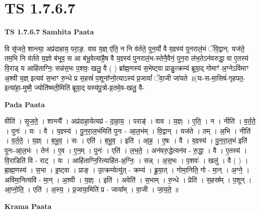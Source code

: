 \documentclass[17pt]{extarticle}
\begin{document}
\section*{ TS 1.7.6.7 }

\textbf{TS 1.7.6.7 } \newline
\textbf{Samhita Paata} \newline

वि सृ॑जते॒ शान्त्या॒ अप्र॑दाहाय॒ परा॒ङ॒. वाव य॒ज्ञ् ए॑ति॒ न नि व॑र्तते॒ पुन॒र्यो वै य॒ज्ञ्स्य॑ पुनरालं॒भं ॅवि॒द्वान्. यज॑ते॒ तम॒भि नि व॑र्तते य॒ज्ञो ब॑भूव॒ स आ ब॑भू॒वेत्या॑है॒ष वै य॒ज्ञ्स्य॑ पुनरालं॒भ-स्तेनै॒वैनं॒ पुन॒रा ल॑भ॒तेऽन॑वरुद्धा॒ वा ए॒तस्य॑ वि॒राड् य आहि॑ताग्निः॒ सन्न॑स॒भः प॒शवः॒ खलु॒ वै ( ) ब्रा᳚ह्म॒णस्य॑ स॒भेष्ट्वा प्राङु॒त्क्रम्य॑ ब्रूया॒द् गोमाꣳ॑ अ॒ग्नेऽवि॑माꣳ अ॒श्वी य॒ज्ञ् इत्यव॑ स॒भाꣳ रु॒न्धे प्र स॒हस्रं॑ प॒शूना᳚प्नो॒त्याऽस्य॑ प्र॒जायां᳚ ॅवा॒जी जा॑यते ॥(यः-स-मा॒सिषं॑-गृहपत॒-इत्या॑हा॒-मुष्मै॒ ज्योति॑ष्मती॒मिति॑ ब्रूया॒द् यस्य॑पु॒त्रो-व्र॒तमे॒व-खलु॒ वै- \newline

\textbf{Pada Paata} \newline

वीति॑ । सृ॒ज॒ते॒ । शान्त्यै᳚ । अप्र॑दाहा॒येत्यप्र॑ - दा॒हा॒य॒ । पराङ्॑ । वाव । य॒ज्ञ्ः । ए॒ति॒ । न । नीति॑ । व॒र्त॒ते॒ । पुनः॑ । यः । वै । य॒ज्ञ्स्य॑ । पु॒न॒रा॒ल॒भंमिति॑ पुनः - आ॒ल॒भंम् । वि॒द्वान् । यज॑ते । तम् । अ॒भि । नीति॑ । व॒र्त॒ते॒ । य॒ज्ञ्ः । ब॒भू॒व॒ । सः । एति॑ । ब॒भू॒व॒ । इति॑ । आ॒ह॒ । ए॒षः । वै । य॒ज्ञ्स्य॑ । पु॒न॒रा॒ल॒भं इति॑ पुनः-आ॒ल॒भंः । तेन॑ । ए॒व । ए॒न॒म् । पुनः॑ । एति॑ । ल॒भ॒ते॒ । अन॑वरु॒द्धेत्यन॑व - रु॒द्धा॒ । वै । ए॒तस्य॑ । वि॒राडिति॑ वि - राट् । यः । आहि॑ताग्नि॒रित्याहि॑त-अ॒ग्निः॒ । सन्न् । अ॒स॒भः । प॒शवः॑ । खलु॑ । वै ( ) । ब्रा॒ह्म॒णस्य॑ । स॒भा । इ॒ष्ट्वा । प्राङ् । उ॒त्क्रम्येत्यु॑त् - क्रम्य॑ । ब्रू॒या॒त् । गोमा॒निति॒ गो - मा॒न् । अ॒ग्ने॒ । अवि॑मा॒नित्यवि॑ - मा॒न् । अ॒श्वी । य॒ज्ञ्ः । इति॑ । अवेति॑ । स॒भाम् । रु॒न्धे । प्रेति॑ । स॒हस्र᳚म् । प॒शून् । आ॒प्नो॒ति॒ । एति॑ । अ॒स्य॒ । प्र॒जाया॒मिति॑ प्र - जाया᳚म् । वा॒जी । जा॒य॒ते॒ ॥  \newline


\textbf{Krama Paata} \newline
\end{document}
